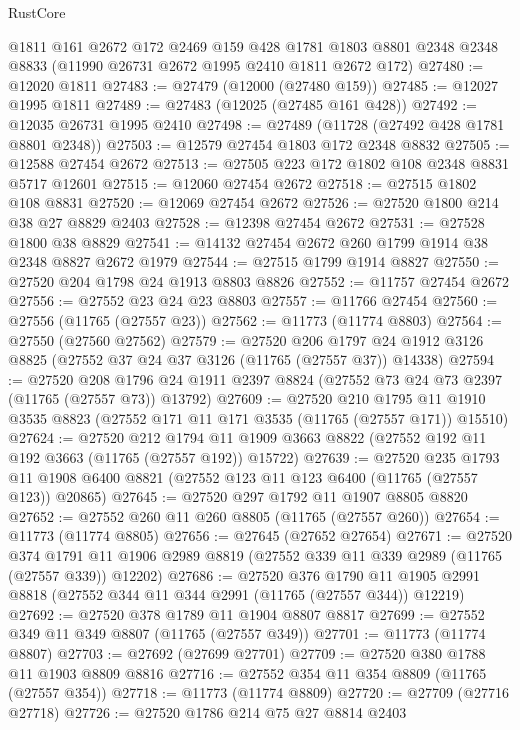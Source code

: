 \begin{lexlean}{RustCore}
\begin{coremodule}
    @1811
    @161
    @2672
    @172
    @2469
    @159
    @428
    @1781
    @1803
    @8801
    @2348
    @2348
    @8833
    (@11990 @26731 @2672 @1995 @2410 @1811 @2672 @172)
@27480 := @12020 @1811
@27483 := @27479 (@12000 (@27480 @159))
@27485 := @12027 @1995 @1811
@27489 := @27483 (@12025 (@27485 @161 @428))
@27492 := @12035 @26731 @1995 @2410
@27498 := @27489 (@11728 (@27492 @428 @1781 @8801 @2348))
@27503 := @12579 @27454 @1803 @172 @2348 @8832
@27505 := @12588 @27454 @2672
@27513 := @27505 @223 @172 @1802 @108 @2348 @8831 @5717 @12601
@27515 := @12060 @27454 @2672
@27518 := @27515 @1802 @108 @8831
@27520 := @12069 @27454 @2672
@27526 := @27520 @1800 @214 @38 @27 @8829 @2403
@27528 := @12398 @27454 @2672
@27531 := @27528 @1800 @38 @8829
@27541 := @14132 @27454 @2672 @260 @1799 @1914 @38 @2348 @8827 @2672 @1979
@27544 := @27515 @1799 @1914 @8827
@27550 := @27520 @204 @1798 @24 @1913 @8803 @8826
@27552 := @11757 @27454 @2672
@27556 := @27552 @23 @24 @23 @8803
@27557 := @11766 @27454
@27560 := @27556 (@11765 (@27557 @23))
@27562 := @11773 (@11774 @8803)
@27564 := @27550 (@27560 @27562)
@27579 := @27520
    @206
    @1797
    @24
    @1912
    @3126
    @8825
    (@27552 @37 @24 @37 @3126 (@11765 (@27557 @37)) @14338)
@27594 := @27520
    @208
    @1796
    @24
    @1911
    @2397
    @8824
    (@27552 @73 @24 @73 @2397 (@11765 (@27557 @73)) @13792)
@27609 := @27520
    @210
    @1795
    @11
    @1910
    @3535
    @8823
    (@27552 @171 @11 @171 @3535 (@11765 (@27557 @171)) @15510)
@27624 := @27520
    @212
    @1794
    @11
    @1909
    @3663
    @8822
    (@27552 @192 @11 @192 @3663 (@11765 (@27557 @192)) @15722)
@27639 := @27520
    @235
    @1793
    @11
    @1908
    @6400
    @8821
    (@27552 @123 @11 @123 @6400 (@11765 (@27557 @123)) @20865)
@27645 := @27520 @297 @1792 @11 @1907 @8805 @8820
@27652 := @27552 @260 @11 @260 @8805 (@11765 (@27557 @260))
@27654 := @11773 (@11774 @8805)
@27656 := @27645 (@27652 @27654)
@27671 := @27520
    @374
    @1791
    @11
    @1906
    @2989
    @8819
    (@27552 @339 @11 @339 @2989 (@11765 (@27557 @339)) @12202)
@27686 := @27520
    @376
    @1790
    @11
    @1905
    @2991
    @8818
    (@27552 @344 @11 @344 @2991 (@11765 (@27557 @344)) @12219)
@27692 := @27520 @378 @1789 @11 @1904 @8807 @8817
@27699 := @27552 @349 @11 @349 @8807 (@11765 (@27557 @349))
@27701 := @11773 (@11774 @8807)
@27703 := @27692 (@27699 @27701)
@27709 := @27520 @380 @1788 @11 @1903 @8809 @8816
@27716 := @27552 @354 @11 @354 @8809 (@11765 (@27557 @354))
@27718 := @11773 (@11774 @8809)
@27720 := @27709 (@27716 @27718)
@27726 := @27520 @1786 @214 @75 @27 @8814 @2403

\end{coremodule}
\end{lexlean}
